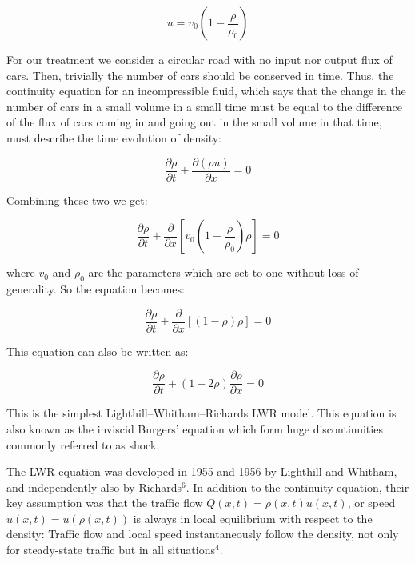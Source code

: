 \documentclass[11pt]{article}
\begin{document}
\begin{equation}
    u = v_0\left(1-\frac{\rho}{\rho_0}\right)
\end{equation}

For our treatment we consider a circular road with no input nor output
flux of cars. Then, trivially the number of cars should be conserved in
time. Thus, the continuity equation for an incompressible fluid, which
says that the change in the number of cars in a small volume in a small
time must be equal to the difference of the flux of cars coming in and
going out in the small volume in that time, must describe the time
evolution of density:

\begin{equation}
    \frac{\partial \rho}{\partial t} + \frac{\partial (\rho u)}{\partial x} = 0
\end{equation}

Combining these two we get:

\begin{equation}
 \frac{\partial \rho}{\partial t} + \frac{\partial}{\partial x}\left[ v_0 \left(1-\frac{\rho}{\rho_0}\right)\rho \right] = 0 
\end{equation}

where \(v_0\) and \(\rho_0\) are the parameters which are set to one
without loss of generality. So the equation becomes:

\begin{equation}
    \frac{\partial \rho}{\partial t} + \frac{\partial}{\partial x}\left[ \left(1-\rho\right)\rho \right] = 0
\end{equation}

This equation can also be written as:

\begin{equation}
    \frac{\partial \rho}{\partial t} + \left(1-2\rho\right)\frac{\partial \rho}{\partial x} = 0
\end{equation}

This is the simplest Lighthill--Whitham--Richards LWR model. This
equation is also known as the inviscid Burgers' equation which form huge
discontinuities commonly referred to as shock.

The LWR equation was developed in 1955 and 1956 by Lighthill and
Whitham, and independently also by Richards\(^6\). In addition to the
continuity equation, their key assumption was that the traffic flow
\(Q(x,t) = \rho(x,t)u(x,t)\), or speed \(u(x,t) = u(\rho(x,t))\) is
always in local equilibrium with respect to the density: Traffic flow
and local speed instantaneously follow the density, not only for
steady-state traffic but in all situations\(^4\).
\end{document}
